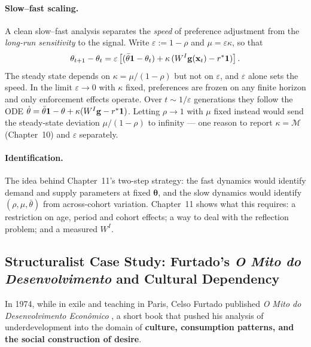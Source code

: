 \documentclass[../structural_economics_book.tex]{subfiles}
\begin{document}
\paragraph{Slow--fast scaling.} A clean slow--fast analysis separates the \textit{speed} of preference adjustment from the \textit{long-run sensitivity} to the signal. Write $\varepsilon := 1 - \rho$ and $\mu = \varepsilon\kappa$, so that
\[
\theta_{t+1} - \theta_t = \varepsilon\left[(\bar{\theta}\mathbf{1} - \theta_t) + \kappa\,(W^I\mathbf{g}(\mathbf{x}_t) - r^*\mathbf{1})\right].
\]
The steady state depends on $\kappa = \mu/(1-\rho)$ but not on $\varepsilon$, and $\varepsilon$ alone sets the speed. In the limit $\varepsilon \to 0$ with $\kappa$ fixed, preferences are frozen on any finite horizon and only enforcement effects operate. Over $t \sim 1/\varepsilon$ generations they follow the ODE $\dot{\theta} = \bar{\theta}\mathbf{1} - \theta + \kappa(W^I\mathbf{g} - r^*\mathbf{1})$. Letting $\rho \to 1$ with $\mu$ fixed instead would send the steady-state deviation $\mu/(1-\rho)$ to infinity --- one reason to report $\kappa = \mathcal{M}$ (Chapter~10) and $\varepsilon$ separately.

\paragraph{Identification.} The idea behind Chapter~11's two-step strategy: the fast dynamics would identify demand and supply parameters at fixed $\boldsymbol{\theta}$, and the slow dynamics would identify $(\rho, \mu, \bar{\theta})$ from across-cohort variation. Chapter~11 shows what this requires: a restriction on age, period and cohort effects; a way to deal with the reflection problem; and a measured $W^I$.


\subsection*{Structuralist Case Study: Furtado's \textit{O Mito do Desenvolvimento} and Cultural Dependency}

In 1974, while in exile and teaching in Paris, Celso Furtado published \textit{O Mito do Desenvolvimento Econ\^{o}mico} \citep{furtado1974mito}, a short book that pushed his analysis of underdevelopment into the domain of \textbf{culture, consumption patterns, and the social construction of desire}.
\end{document}
